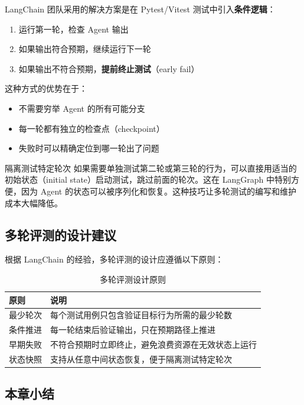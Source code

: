 \documentclass[a4paper]{article}
\begin{document}
LangChain 团队采用的解决方案是在 Pytest/Vitest 测试中引入\textbf{条件逻辑}：

\begin{enumerate}
  \item 运行第一轮，检查 Agent 输出
  \item 如果输出符合预期，继续运行下一轮
  \item 如果输出不符合预期，\textbf{提前终止测试}（early fail）
\end{enumerate}

这种方式的优势在于：
\begin{itemize}
  \item 不需要穷举 Agent 的所有可能分支
  \item 每一轮都有独立的检查点（checkpoint）
  \item 失败时可以精确定位到哪一轮出了问题
\end{itemize}

\begin{knowledgebox}{隔离测试特定轮次}
如果需要单独测试第二轮或第三轮的行为，可以直接用适当的初始状态（initial state）启动测试，跳过前面的轮次。这在 LangGraph 中特别方便，因为 Agent 的状态可以被序列化和恢复。这种技巧让多轮测试的编写和维护成本大幅降低。
\end{knowledgebox}

\subsection{多轮评测的设计建议}

根据 LangChain 的经验，多轮评测的设计应遵循以下原则：

\begin{table}[H]
\centering
\caption{多轮评测设计原则}
\begin{tabular}{lp{9cm}}
\toprule
\textbf{原则} & \textbf{说明} \\
\midrule
最少轮次 & 每个测试用例只包含验证目标行为所需的最少轮数 \\
条件推进 & 每一轮结束后验证输出，只在预期路径上推进 \\
早期失败 & 不符合预期时立即终止，避免浪费资源在无效状态上运行 \\
状态快照 & 支持从任意中间状态恢复，便于隔离测试特定轮次 \\
\bottomrule
\end{tabular}
\end{table}

\subsection{本章小结}
\end{document}
